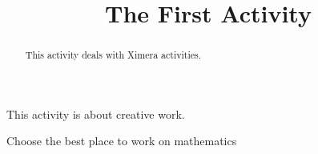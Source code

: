 \documentclass{ximera}
\title{The First Activity}
\begin{document}
  
\begin{abstract}  
	This activity deals with Ximera activities.
\end{abstract}  
\maketitle  

This activity is about creative work.  
\begin{exercise}  
  Choose the best place to work on mathematics
  \begin{multipleChoice}  
  \end{multipleChoice}  
\end{exercise}  
\end{document}
